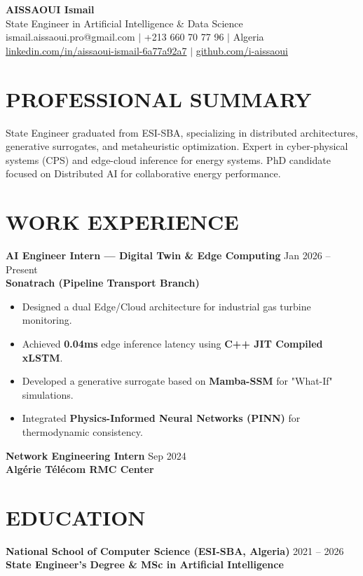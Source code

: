 \documentclass[a4paper,11pt]{article}
\begin{document}
\begin{center}
    {\Huge\bfseries\color{titleblue} AISSAOUI Ismail}\\[4pt]
    {\Large State Engineer in Artificial Intelligence \& Data Science}\\[6pt]
    ismail.aissaoui.pro@gmail.com $|$ +213 660 70 77 96 $|$ Algeria \\
    \href{https://linkedin.com/in/aissaoui-ismail-6a77a92a7}{linkedin.com/in/aissaoui-ismail-6a77a92a7} $|$ \href{https://github.com/i-aissaoui}{github.com/i-aissaoui}
\end{center}

\section{PROFESSIONAL SUMMARY}
State Engineer graduated from ESI-SBA, specializing in distributed architectures, generative surrogates, and metaheuristic optimization. Expert in cyber-physical systems (CPS) and edge-cloud inference for energy systems. PhD candidate focused on Distributed AI for collaborative energy performance.

\section{WORK EXPERIENCE}
\textbf{AI Engineer Intern — Digital Twin & Edge Computing} \hfill Jan 2026 -- Present \\
\textbf{Sonatrach (Pipeline Transport Branch)} \\
\begin{itemize}
    \item Designed a dual Edge/Cloud architecture for industrial gas turbine monitoring.
    \item Achieved \textbf{0.04ms} edge inference latency using \textbf{C++ JIT Compiled xLSTM}.
    \item Developed a generative surrogate based on \textbf{Mamba-SSM} for "What-If" simulations.
    \item Integrated \textbf{Physics-Informed Neural Networks (PINN)} for thermodynamic consistency.
\end{itemize}

\textbf{Network Engineering Intern} \hfill Sep 2024 \\
\textbf{Algérie Télécom RMC Center}

\section{EDUCATION}
\textbf{National School of Computer Science (ESI-SBA, Algeria)} \hfill 2021 -- 2026 \\
\textbf{State Engineer's Degree \& MSc in Artificial Intelligence}
\end{document}
